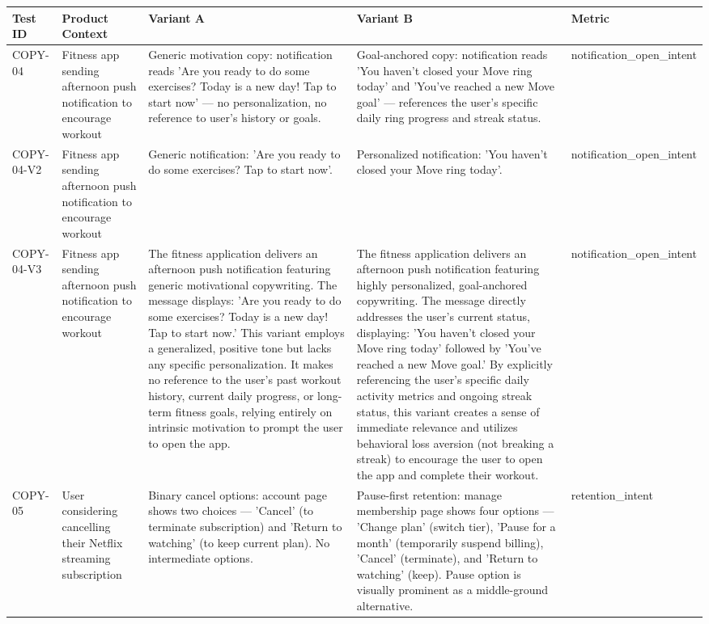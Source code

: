 \begin{table}[h]
\centering
\scriptsize
\renewcommand{\arraystretch}{1.3}
\begin{tabular}{p{1.5cm} p{3.5cm} p{4cm} p{4cm} p{2cm}}
\toprule
\textbf{Test ID} & \textbf{Product Context} & \textbf{Variant A} & \textbf{Variant B} & \textbf{Metric} \\
\midrule
COPY-04 & Fitness app sending afternoon push notification to encourage workout & Generic motivation copy: notification reads 'Are you ready to do some exercises? Today is a new day! Tap to start now' — no personalization, no reference to user's history or goals. & Goal-anchored copy: notification reads 'You haven't closed your Move ring today' and 'You've reached a new Move goal' — references the user's specific daily ring progress and streak status. & notification_open_intent \\
\midrule
COPY-04-V2 & Fitness app sending afternoon push notification to encourage workout & Generic notification: 'Are you ready to do some exercises? Tap to start now'. & Personalized notification: 'You haven't closed your Move ring today'. & notification_open_intent \\
\midrule
COPY-04-V3 & Fitness app sending afternoon push notification to encourage workout & The fitness application delivers an afternoon push notification featuring generic motivational copywriting. The message displays: 'Are you ready to do some exercises? Today is a new day! Tap to start now.' This variant employs a generalized, positive tone but lacks any specific personalization. It makes no reference to the user's past workout history, current daily progress, or long-term fitness goals, relying entirely on intrinsic motivation to prompt the user to open the app. & The fitness application delivers an afternoon push notification featuring highly personalized, goal-anchored copywriting. The message directly addresses the user's current status, displaying: 'You haven't closed your Move ring today' followed by 'You've reached a new Move goal.' By explicitly referencing the user's specific daily activity metrics and ongoing streak status, this variant creates a sense of immediate relevance and utilizes behavioral loss aversion (not breaking a streak) to encourage the user to open the app and complete their workout. & notification_open_intent \\
\midrule
COPY-05 & User considering cancelling their Netflix streaming subscription & Binary cancel options: account page shows two choices — 'Cancel' (to terminate subscription) and 'Return to watching' (to keep current plan). No intermediate options. & Pause-first retention: manage membership page shows four options — 'Change plan' (switch tier), 'Pause for a month' (temporarily suspend billing), 'Cancel' (terminate), and 'Return to watching' (keep). Pause option is visually prominent as a middle-ground alternative. & retention_intent \\

\end{tabular}
\end{table}
